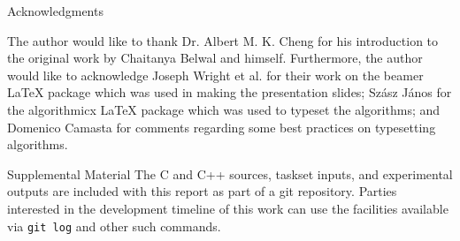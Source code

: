 \documentclass{article}
\begin{document}
\begin{section}{Acknowledgments}
  \begin{paragraph}{}
    The author would like to thank Dr. Albert M. K. Cheng for his introduction to the original work by Chaitanya Belwal and himself.
    Furthermore, the author would like to acknowledge Joseph Wright et al. for their work on the beamer {\LaTeX} package \autocite{beamer}
    which was used in making the presentation slides; Szász János for the algorithmicx {\LaTeX} package\autocite{algorithmicx}
    which was used to typeset the algorithms; and Domenico Camasta for comments regarding some best practices on typesetting algorithms\autocite{algorithm2eInBeamer}.
  \end{paragraph}
\end{section}

\printbibliography

\begin{section}{Supplemental Material}
  The C and C++ sources, taskset inputs, and experimental outputs are included with this report as part of a git repository.
  Parties interested in the development timeline of this work can use the facilities available via \texttt{git log} and other such commands.
\end{section}
\end{document}
